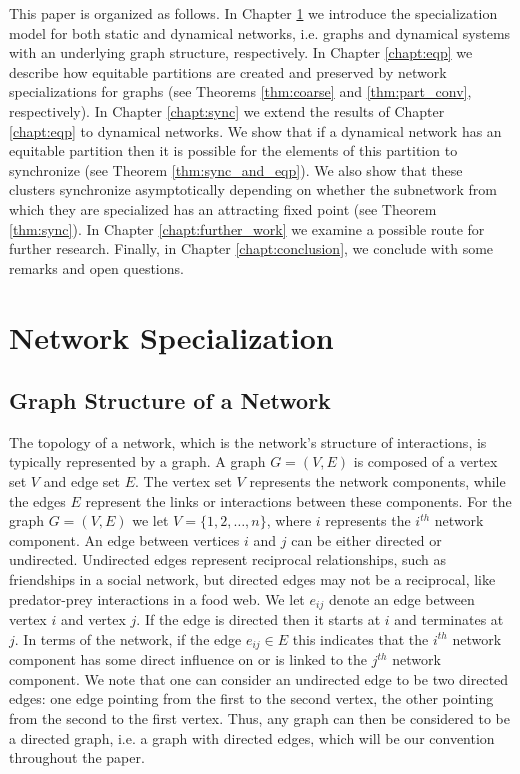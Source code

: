 \documentclass[12pt]{thesis}
\begin{document}
This paper is organized as follows. In Chapter \ref{chapt:net_spec} we introduce the specialization model for both static and dynamical networks, i.e. graphs and dynamical systems with an underlying graph structure, respectively.
In Chapter \ref{chapt:eqp} we describe how equitable partitions are created and preserved by network specializations for graphs (see Theorems \ref{thm:coarse} and \ref{thm:part_conv}, respectively).
In Chapter \ref{chapt:sync} we extend the results of Chapter \ref{chapt:eqp} to dynamical networks.
We show that if a dynamical network has an equitable partition then it is possible for the elements of this partition to synchronize (see Theorem \ref{thm:sync_and_eqp}).
We also show that these clusters synchronize asymptotically depending on whether the subnetwork from which they are specialized has an attracting fixed point (see Theorem \ref{thm:sync}).
In Chapter \ref{chapt:further_work} we examine a possible route for further research.
Finally, in Chapter \ref{chapt:conclusion}, we conclude with some remarks and open questions.


\chapter{Network Specialization}\label{chapt:net_spec}

\section{Graph Structure of a Network}

The topology of a network, which is the network's structure of interactions, is typically represented by a graph.
A {graph} $G=(V,E)$ is composed of a {vertex set} $V$ and {edge set} $E$.
The vertex set $V$ represents the network {components}, while the edges $E$ represent the links or {interactions} between these components.
For the graph $G=(V,E)$ we let $V=\{1,2,\dots,n\}$, where $i$ represents the $i^{th}$ network component.
An edge between vertices $i$ and $j$ can be either directed or undirected.
Undirected edges represent reciprocal relationships, such as
friendships in a social network, but directed edges may not be a reciprocal, like predator-prey interactions in a food web.
We let $e_{ij}$ denote an edge between vertex $i$ and vertex $j$.
If the edge is directed then it starts at $i$ and terminates at $j$.
In terms of the network, if the edge $e_{ij} \in E$ this indicates that the $i^{th}$ network component has some direct influence on or is linked to the $j^{th}$ network component.
We note that one can consider an undirected edge to be two directed edges: one edge pointing from the first to the second vertex, the other pointing from the second to the first vertex.
Thus, any graph can then be considered to be a directed graph, i.e. a graph with directed edges, which will be our convention throughout the paper.
\end{document}
